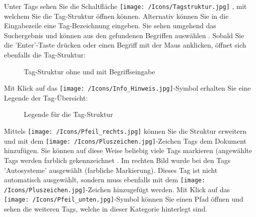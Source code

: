 Unter Tags  sehen Sie die Schaltfläche \texttt{[image: /Icons/Tagstruktur.jpg]} , mit welchem Sie die Tag-Struktur öffnen können. Alternativ können Sie in die Eingabezeile  eine Tag-Bezeichnung eingeben. Sie sehen umgehend das Suchergebnis und können aus den gefundenen Begriffen auswählen . Sobald Sie die 'Enter'-Taste drücken oder einen Begriff mit der Maus anklicken, öffnet sich ebenfalls die Tag-Struktur:

\begin{figure}[H]
\caption{Tag-Struktur ohne und mit Begriffseingabe}
\end{figure}

Mit Klick auf das \texttt{[image: /Icons/Info\_Hinweis.jpg]}-Symbol  erhalten Sie eine Legende der Tag-Übersicht:

\begin{figure}[H]
\caption{Legende für die Tag-Struktur}
\end{figure}

Mittels \texttt{[image: /Icons/Pfeil\_rechts.jpg]} können Sie die Struktur erweitern und mit dem \texttt{[image: /Icons/Pluszeichen.jpg]}-Zeichen  Tags dem Dokument hinzufügen. Sie können auf diese Weise beliebig viele Tags markieren (angewählte Tags werden farblich gekennzeichnet . Im rechten Bild wurde bei den Tags 'Autosysteme' ausgewählt  (farbliche Markierung). Dieses Tag ist nicht automatisch ausgewählt, sondern muss ebenfalls mit dem \texttt{[image: /Icons/Pluszeichen.jpg]}-Zeichen hinzugefügt werden. Mit Klick auf das \texttt{[image: /Icons/Pfeil\_unten.jpg]}-Symbol können Sie einen Pfad öffnen und sehen die weiteren Tags, welche in dieser Kategorie hinterlegt sind.  \newline


